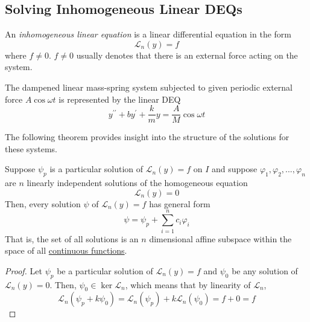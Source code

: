 \documentclass{article}
\newcounter{theorem}[section]
\newcounter{definition}[section]
\newcounter{example}[section]
\begin{document}
  \subsection{Solving Inhomogeneous Linear DEQs}

    \begin{definition}
      \label{def:inhomogeneous-linear-deq}
    An \textit{inhomogeneous linear equation} is a linear differential equation in the form
    \begin{equation}
      \mathcal{L}_n (y) = f
    \end{equation}
    where $f \neq 0$. $f \neq 0$ usually denotes that there is an external force acting on the system. 
    \end{definition}

    \begin{example}
      \label{ex:dampened-linear-mass-spring-system-with}
    The dampened linear mass-spring system subjected to given periodic external force $A \cos{\omega t}$ is represented by the linear DEQ
    \begin{equation}
      y^{\prime \prime} + by^\prime + \frac{k}{m} y = \frac{A}{M} \cos{\omega t}
    \end{equation}
    \end{example}

    The following theorem provides insight into the structure of the solutions for these systems. 
    \begin{theorem}
      \label{thm:general-solution-of-the-nonhomogeneous-equation}
    Suppose $\psi_p$ is a particular solution of $\mathcal{L}_n (y) = f$ on $I$ and suppose $\varphi_1, \varphi_2, ..., \varphi_n$ are $n$ linearly independent solutions of the homogeneous equation 
    \begin{equation}
      \mathcal{L}_n (y) = 0
    \end{equation}
    Then, every solution $\psi$ of $\mathcal{L}_n (y) = f$ has general form
    \begin{equation}
      \psi = \psi_p + \sum_{i=1}^n c_i \varphi_i
    \end{equation}
    That is, the set of all solutions is an $n$ dimensional affine subspace within the space of all \hyperref[pst-def:continuous_func]{continuous functions}. 
    \end{theorem}
    \begin{proof}
    Let $\psi_p$ be a particular solution of $\mathcal{L}_n (y) = f$ and $\psi_0$ be any solution of $\mathcal{L}_n (y) = 0$. Then, $\psi_0 \in \ker{\mathcal{L}_n}$, which means that by linearity of $\mathcal{L}_n$, 
    \begin{equation}
      \mathcal{L}_n (\psi_p + k \psi_0) = \mathcal{L}_n (\psi_p) + k \mathcal{L}_n (\psi_0) = f + 0 = f
    \end{equation}
    \end{proof}
\end{document}
